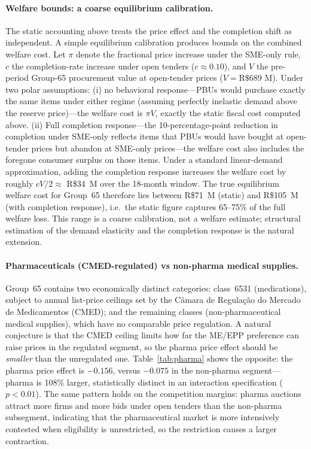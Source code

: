\paragraph{Welfare bounds: a coarse equilibrium calibration.}
The static accounting above treats the price effect and the completion shift as independent. A simple equilibrium calibration produces bounds on the combined welfare cost. Let $\pi$ denote the fractional price increase under the SME-only rule, $c$ the completion-rate increase under open tenders ($c \approx 0.10$), and $V$ the pre-period Group-65 procurement value at open-tender prices ($V = \text{R\$689~M}$). Under two polar assumptions: (i) no behavioral response---PBUs would purchase exactly the same items under either regime (assuming perfectly inelastic demand above the reserve price)---the welfare cost is $\pi V$, exactly the static fiscal cost computed above. (ii) Full completion response---the 10-percentage-point reduction in completion under SME-only reflects items that PBUs would have bought at open-tender prices but abandon at SME-only prices---the welfare cost also includes the foregone consumer surplus on those items. Under a standard linear-demand approximation, adding the completion response increases the welfare cost by roughly $cV/2 \approx$ R\$34~M over the 18-month window. The true equilibrium welfare cost for Group~65 therefore lies between R\$71~M (static) and R\$105~M (with completion response), i.e.\ the static figure captures 65--75\% of the full welfare loss. This range is a coarse calibration, not a welfare estimate; structural estimation of the demand elasticity and the completion response is the natural extension.

\paragraph{Pharmaceuticals (CMED-regulated) vs non-pharma medical supplies.}
Group~65 contains two economically distinct categories: class~6531 (medications), subject to annual list-price ceilings set by the C\^amara de Regula\c{c}\~ao do Mercado de Medicamentos (CMED); and the remaining classes (non-pharmaceutical medical supplies), which have no comparable price regulation. A natural conjecture is that the CMED ceiling limits how far the ME/EPP preference can raise prices in the regulated segment, so the pharma price effect should be \emph{smaller} than the unregulated one. Table~\ref{tab:pharma} shows the opposite: the pharma price effect is $-0.156$, versus $-0.075$ in the non-pharma segment---pharma is 108\% larger, statistically distinct in an interaction specification ($p < 0.01$). The same pattern holds on the competition margins: pharma auctions attract more firms and more bids under open tenders than the non-pharma subsegment, indicating that the pharmaceutical market is more intensively contested when eligibility is unrestricted, so the restriction causes a larger contraction.

